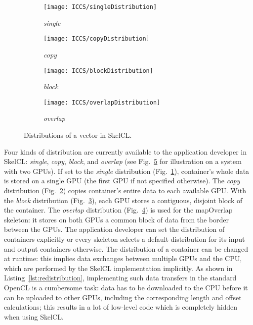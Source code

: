 \begin{figure}[tb]
  \centering
  \begin{subfigure}{.22\textwidth}
    \texttt{[image: ICCS/singleDistribution]}
    \caption{\emph{single}}
    \label{fig:distributions:single}
  \end{subfigure}
  \hfill
  \begin{subfigure}{.22\textwidth}
    \texttt{[image: ICCS/copyDistribution]}
    \caption{\emph{copy}}
    \label{fig:distributions:copy}
  \end{subfigure}
  \hfill
  \begin{subfigure}{.22\textwidth}
    \texttt{[image: ICCS/blockDistribution]}
    \caption{\emph{block}}
    \label{fig:distributions:block}
  \end{subfigure}
  \hfill
  \begin{subfigure}{.22\textwidth}
    \texttt{[image: ICCS/overlapDistribution]}
    \caption{\emph{overlap}}
    \label{fig:distributions:overlap}
  \end{subfigure}
  \caption{Distributions of a vector in SkelCL.}
  \label{fig:distributions}
\end{figure}

Four kinds of distribution are currently available to the application developer in SkelCL:
\emph{single}, \emph{copy}, \emph{block}, and \emph{overlap} (see Fig.~\ref{fig:distributions} for illustration on a system with two GPUs).
If set to the \emph{single} distribution (Fig.~\ref{fig:distributions:single}), container's whole data is stored on a single GPU (the first GPU if not specified otherwise).
The \emph{copy} distribution (Fig.~\ref{fig:distributions:copy}) copies container's entire data to each available GPU.
With the \emph{block} distribution (Fig.~\ref{fig:distributions:block}), each GPU stores a contiguous, disjoint block of the container.
The \emph{overlap} distribution (Fig.~\ref{fig:distributions:overlap}) is used for the mapOverlap skeleton:
it stores on both GPUs a common block of data from the border between the GPUs.
The application developer can set the distribution of containers explicitly or every skeleton selects a default distribution for its input and output containers otherwise.
The distribution of a container can be changed at runtime:
this implies data exchanges between multiple GPUs and the CPU, which are performed by the SkelCL implementation implicitly.
As shown in Listing~\ref{lst:redistribution}, implementing such data transfers in the standard OpenCL is a cumbersome task:
data has to be downloaded to the CPU before it can be uploaded to other GPUs, including the corresponding length and offset calculations;
this results in a lot of low-level code which is completely hidden when using SkelCL.

